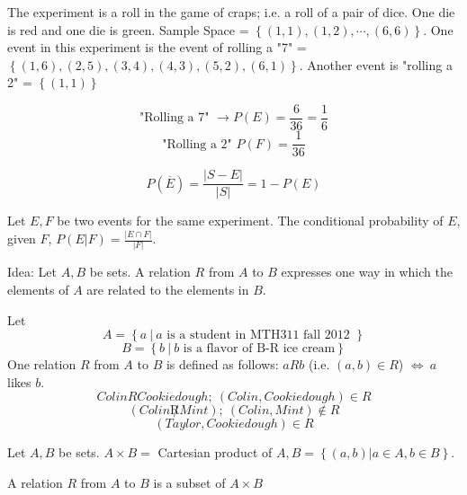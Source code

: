 \begin{example}
The experiment is a roll in the game of craps; i.e. a roll of a pair of dice. One die is red and one die is green. Sample Space = $\left\{ (1,1), (1,2), \cdots, (6,6) \right\}$. One event in this experiment is the event of rolling a "7" = $\left\{ (1,6), (2,5), (3,4), (4,3), (5,2), (6,1) \right\}$. Another event is "rolling a 2" = $\left\{ (1,1) \right\}$

\[ \text{"Rolling a 7" } \to P(E)=\frac{6}{36}=\frac{1}{6} \]
\[ \text{"Rolling a 2" } P(F) = \frac{1}{36}\]
\end{example}
\begin{theorem}
\[ P(\overline{E}) = \frac{|S-E|}{|S|} = 1 - P(E)\]
\end{theorem}
\begin{theorem}
Let $E,F$ be two events for the same experiment. The conditional probability of $E$, given $F$, $P(E|F) = \frac{|E \cap F|}{|F|}$.
\end{theorem}
Idea: Let $A,B$ be sets. A relation $R$ from $A$ to $B$ expresses one way in which the elements of $A$ are related to the elements in $B$.
\begin{example}
Let 
\[ A=\left\{ a\ |\ a \text{ is a student in MTH311 fall 2012 }\right\} \]
\[ B = \left\{b\ |\ b \text{ is a flavor of B-R ice cream}\right\}\]
One relation $R$ from $A$ to $B$ is defined as follows: $aRb$ (i.e. $(a,b)\in R$) $\iff\ a$ likes $b$.
\[ ColinRCookiedough;\ (Colin, Cookiedough)\in R \]
\[ (Colin \not R Mint);\ (Colin,Mint)\not\in R\]
\[ (Taylor,Cookiedough)\in R\]
\end{example}
\begin{theorem}
Let $A,B$ be sets. $A \times B =$ Cartesian product of $A,B= \left\{ (a,b) | a\in A, b\in B \right\}$.
\end{theorem}
\begin{theorem}
A relation $R$ from $A$ to $B$ is a subset of $A \times B$
\end{theorem}


